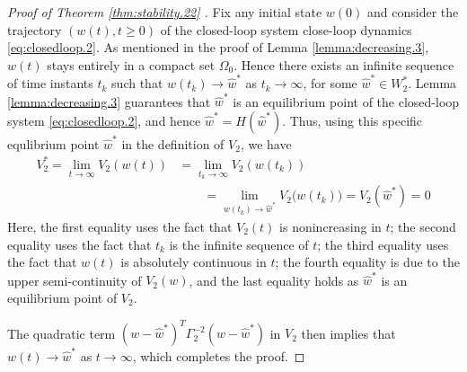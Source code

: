 \begin{proof}[Proof of Theorem \ref{thm:stability.22} ] 
		 Fix any initial state $w(0)$ and consider the trajectory $(w(t), t\geq 0)$ of the
		 closed-loop system close-loop dynamics  \eqref{eq:closedloop.2}.		 
		 As mentioned in the proof of Lemma \ref{lemma:decreasing.3},
		 $w(t)$ stays entirely in a compact set $\Omega_0$.   Hence there exists an infinite 
		 sequence of time instants ${t_k}$ such that $w(t_k)\to \hat {w}^*$ as $t_k\to\infty$, 
		 for some $\hat w^* \in W_2^*$. Lemma \ref{lemma:decreasing.3} guarantees that
		 $\hat w^*$ is an equilibrium point of the closed-loop system \eqref{eq:closedloop.2}, and hence $\hat w^*=H(\hat{w}^*)$.
		  Thus, using this specific equlibrium point $\hat {w}^*$ in the definition of $V_2$, we have 
		 \begin{align}
			 V_2^* =\lim\limits_{t\to \infty} V_2(w(t)) &= \lim\limits_{t_k\to \infty} V_2(w(t_k)) \nonumber\\
				 &\qquad=\lim\limits_{w(t_k) \to \hat w^*} V_2\big( w(t_k)\big) = V_2(\hat w^*) = 0 \nonumber
		 \end{align}
		 Here, the first equality uses the  fact that
		 $V_2(t)$ is nonincreasing in $t$; the second equality uses the fact that
		 $t_k$ is the infinite sequence of $t$; the third equality uses the fact that $w(t)$ is
		 absolutely continuous in $t$; the fourth equality is due to the upper semi-continuity of $V_2(w)$, and the last equality holds as $\hat {w}^*$ is an equilibrium point of $V_2$. 
		 
		 The quadratic term $(w-\hat w^*)^T\Gamma_2^{-2}(w-\hat w^*)$
		 in $V_2$ then implies that $w(t)\to \hat {w}^*$ as $t\to \infty$, which completes the proof. 
\end{proof}         

